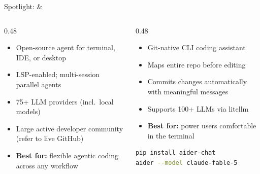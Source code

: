 \begin{frame}[fragile]{Spotlight:  \& }
  \begin{columns}[T, onlytextwidth]
    \begin{column}{0.48\textwidth}
      \begin{block}{}
        \begin{itemize}
          \item Open-source agent for terminal, IDE, or desktop
          \item LSP-enabled; multi-session parallel agents
          \item 75+ LLM providers (incl.\ local models)
          \item Large active developer community (refer to live GitHub)
          \item \textbf{Best for:} flexible agentic coding across any workflow
        \end{itemize}
      \end{block}
    \end{column}
    \hfill
    \begin{column}{0.48\textwidth}
      \begin{block}{}
        \begin{itemize}
          \item Git-native CLI coding assistant
          \item Maps entire repo before editing
          \item Commits changes automatically with meaningful messages
          \item Supports 100+ LLMs via litellm
          \item \textbf{Best for:} power users comfortable in the terminal
        \end{itemize}
        \begin{lstlisting}[language=bash, numbers=none]
pip install aider-chat
aider --model claude-fable-5
        \end{lstlisting}
      \end{block}
    \end{column}
  \end{columns}
\end{frame}

